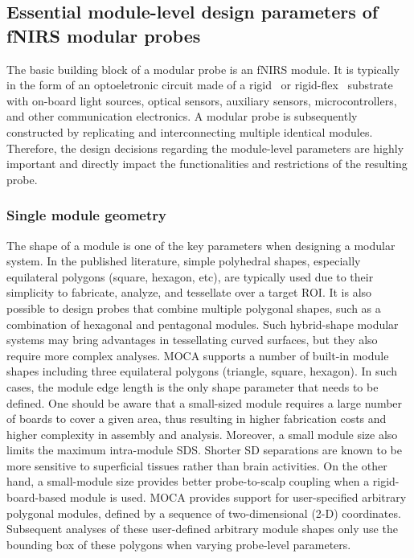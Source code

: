\subsection{Essential module-level design parameters of fNIRS modular probes}
The basic building block of a modular probe is an \ac{fNIRS} module. It is typically in the form of an optoeletronic circuit made of a rigid~\cite{Chitnis2016, Bci2017, Zhao2019, Wyser2017} or rigid-flex~\cite{Muehlemann2008, Hallacoglu2016} substrate with on-board light sources, optical sensors, auxiliary sensors, microcontrollers, and other communication electronics. A modular probe is subsequently constructed by replicating and interconnecting multiple identical modules. Therefore, the design decisions regarding the module-level parameters are highly important and directly impact the functionalities and restrictions of the resulting probe.

\subsubsection{Single module geometry}
The shape of a module is one of the key parameters when designing a modular system. In the published literature, simple polyhedral shapes, especially equilateral polygons (square, hexagon, etc), are typically used due to their simplicity to fabricate, analyze, and tessellate over a target \ac{ROI}. It is also possible to design probes that combine multiple polygonal shapes, such as a combination of hexagonal and pentagonal modules. Such hybrid-shape modular systems may bring advantages in tessellating curved surfaces, but they also require more complex analyses. \ac{MOCA} supports a number of built-in module shapes including three equilateral polygons (triangle, square, hexagon). In such cases, the module edge length is the only shape parameter that needs to be defined. One should be aware that a small-sized module requires a large number of boards to cover a given area, thus resulting in higher fabrication costs and higher complexity in assembly and analysis. Moreover, a small module size also limits the maximum intra-module \ac{SDS}. Shorter \ac{SD} separations are known to be more sensitive to superficial tissues rather than brain activities. On the other hand, a small-module size provides better probe-to-scalp coupling when a rigid-board-based module is used. \ac{MOCA} provides support for user-specified arbitrary polygonal modules, defined by a sequence of two-dimensional (2-D) coordinates. Subsequent analyses of these user-defined arbitrary module shapes only use the bounding box of these polygons when varying probe-level parameters.

